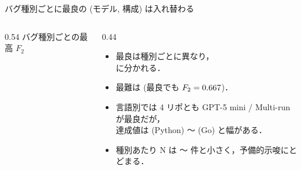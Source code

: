 \documentclass[10pt, aspectratio=169, t]{beamer}
\begin{document}
\begin{frame}{バグ種別ごとに最良の (モデル, 構成) は入れ替わる}
    \begin{columns}[T]
    \begin{column}{0.54\textwidth}
        \centering
        \small バグ種別ごとの最高 $F_2$\\[3pt]
        \scriptsize
        \resizebox{\linewidth}{!}{}
    \end{column}
    \begin{column}{0.44\textwidth}
        \begin{itemize}
            \item 最良は種別ごとに異なり，\\\catWinners{} に分かれる．
            \item 最難は \hardestCat{} (最良でも $F_2 = 0.667{}$)．
            \item 言語別では 4 リポとも GPT-5 mini / Multi-run が最良だが，\\達成値は \bestByFastapiF{} (Python) 〜 \bestByChiF{} (Go) と幅がある．
            \item 種別あたり N は \catNmin{}〜\catNmax{} 件と小さく，\alert{予備的示唆}にとどまる．
        \end{itemize}
    \end{column}
    \end{columns}
\end{frame}
\end{document}
